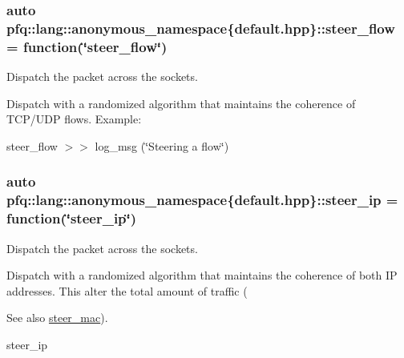 \subsubsection[{\texorpdfstring{steer\+\_\+flow}{steer_flow}}]{\setlength{\rightskip}{0pt plus 5cm}auto pfq\+::lang\+::anonymous\+\_\+namespace\{default.\+hpp\}\+::steer\+\_\+flow = {\bf function}(\char`\"{}steer\+\_\+flow\char`\"{})}\hypertarget{namespacepfq_1_1lang_1_1anonymous__namespace_02default_8hpp_03_adeb44c976ac903e7b13addb65ac41f9f}{}\label{namespacepfq_1_1lang_1_1anonymous__namespace_02default_8hpp_03_adeb44c976ac903e7b13addb65ac41f9f}


Dispatch the packet across the sockets. 

Dispatch with a randomized algorithm that maintains the coherence of T\+C\+P/\+U\+DP flows. Example\+:

steer\+\_\+flow $>$$>$ log\+\_\+msg (\char`\"{}\+Steering a flow\char`\"{}) 
\subsubsection[{\texorpdfstring{steer\+\_\+ip}{steer_ip}}]{\setlength{\rightskip}{0pt plus 5cm}auto pfq\+::lang\+::anonymous\+\_\+namespace\{default.\+hpp\}\+::steer\+\_\+ip = {\bf function}(\char`\"{}steer\+\_\+ip\char`\"{})}\hypertarget{namespacepfq_1_1lang_1_1anonymous__namespace_02default_8hpp_03_afe1c69c555a75021f7e637086cb1264c}{}\label{namespacepfq_1_1lang_1_1anonymous__namespace_02default_8hpp_03_afe1c69c555a75021f7e637086cb1264c}


Dispatch the packet across the sockets. 

Dispatch with a randomized algorithm that maintains the coherence of both IP addresses. This alter the total amount of traffic (\begin{DoxySeeAlso}{See also}
\hyperlink{namespacepfq_1_1lang_1_1anonymous__namespace_02default_8hpp_03_ad51e91e3b485c729ac1ba39a46e337a0}{steer\+\_\+mac}).
\end{DoxySeeAlso}
steer\+\_\+ip 
